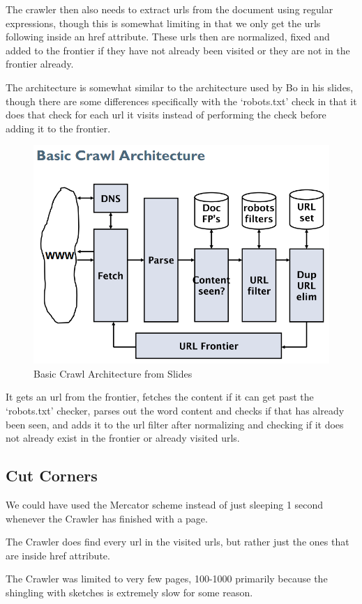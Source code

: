 	The crawler then also needs to extract urls from the document using regular expressions, though this is somewhat limiting in that we only get the urls following inside an href attribute. These urls then are normalized, fixed and added to the frontier if they have not already been visited or they are not in the frontier already.
	
	The architecture is somewhat similar to the architecture used by Bo in his slides, though there are some differences specifically with the `robots.txt' check in that it does that check for each url it visits instead of performing the check before adding it to the frontier.
	
	\begin{figure}[H]
	\centering
	\includegraphics[width=0.7\linewidth]{./Media/basiccrawlarchitecture}
	\caption{Basic Crawl Architecture from Slides}
	\label{fig:basiccrawlarchitecture}
	\end{figure}
	
	It gets an url from the frontier, fetches the content if it can get past the `robots.txt' checker, parses out the word content and checks if that has already been seen, and adds it to the url filter after normalizing and checking if it does not already exist in the frontier or already visited urls.
	
	\subsection{Cut Corners}
	We could have used the Mercator scheme instead of just sleeping 1 second whenever the Crawler has finished with a page.
	
	The Crawler does find every url in the visited urls, but rather just the ones that are inside href attribute.
	
	The Crawler was limited to very few pages, 100-1000 primarily because the shingling with sketches is extremely slow for some reason.
	
